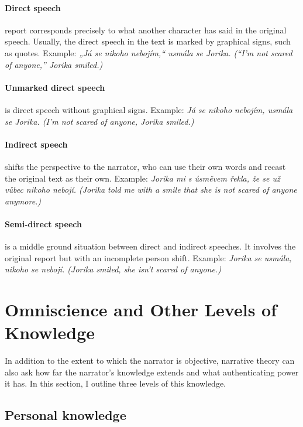 \paragraph{Direct speech} report corresponds precisely to what another character has said in the original speech. \cite{ChapterNine} Usually, the direct speech in the text is marked by graphical signs, such as quotes. Example: \emph{„Já se nikoho nebojím,“ usmála se Jorika. (``I'm not scared of anyone,'' Jorika smiled.)}

\paragraph{Unmarked direct speech} is direct speech without graphical signs. Example: \emph{Já se nikoho nebojím, usmála se Jorika. (I'm not scared of anyone, Jorika smiled.)}

\paragraph{Indirect speech} shifts the perspective to the narrator, who can use their own words and recast the original text as their own. \cite{ChapterNine} Example: \emph{Jorika mi s úsměvem řekla, že se už vůbec nikoho nebojí. (Jorika told me with a smile that she is not scared of anyone anymore.)}

\paragraph{Semi-direct speech} is a middle ground situation between direct and indirect speeches. It involves the original report but with an incomplete person shift. \cite{ChapterNine} Example: \emph{Jorika se usmála, nikoho se nebojí. (Jorika smiled, she isn't scared of anyone.)}

\section{Omniscience and Other Levels of Knowledge}

In addition to the extent to which the narrator is objective, narrative theory can also ask how far the narrator's knowledge extends and what authenticating power it has. In this section, I outline three levels of this knowledge.

\subsection{Personal knowledge}


